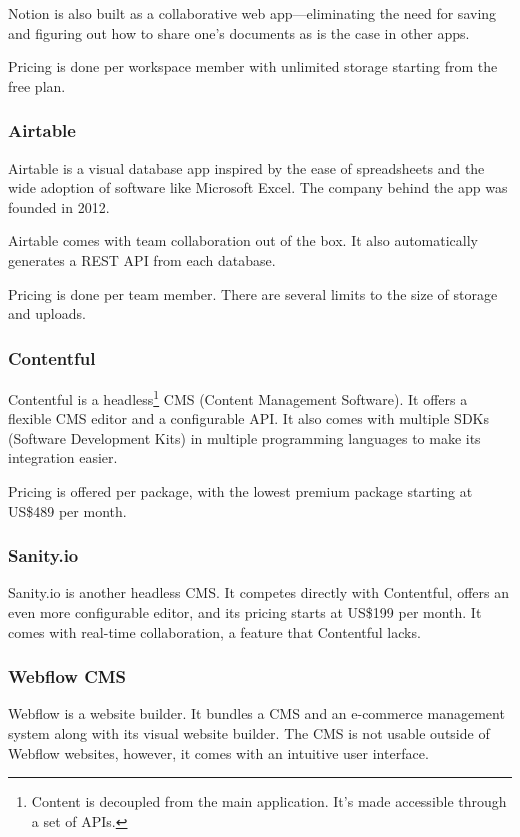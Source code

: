 Notion is also built as a collaborative web app---eliminating the need
for saving and figuring out how to share one's documents as is the case
in other apps.

Pricing is done per workspace member with unlimited storage starting
from the free plan.

\subsubsection{Airtable}

Airtable is a visual database app inspired by the ease of spreadsheets
and the wide adoption of software like Microsoft Excel. The company
behind the app was founded in 2012.

Airtable comes with team collaboration out of the box. It also
automatically generates a REST API from each database.

Pricing is done per team member. There are several limits to the size of
storage and uploads.

\subsubsection{Contentful}

Contentful is a headless\footnote{Content is decoupled from the main
	application. It's made accessible through a set of APIs.} CMS (Content
Management Software). It offers a flexible CMS editor and a configurable
API. It also comes with multiple SDKs (Software Development Kits) in
multiple programming languages to make its integration easier.

Pricing is offered per package, with the lowest premium package starting
at US\$489 per month.

\subsubsection{Sanity.io}

Sanity.io is another headless CMS. It competes directly with Contentful,
offers an even more configurable editor, and its pricing starts at
US\$199 per month. It comes with real-time collaboration, a feature that
Contentful lacks.

\subsubsection{Webflow CMS}

Webflow is a website builder. It bundles a CMS and an e-commerce
management system along with its visual website builder. The CMS is not
usable outside of Webflow websites, however, it comes with an intuitive
user interface.


